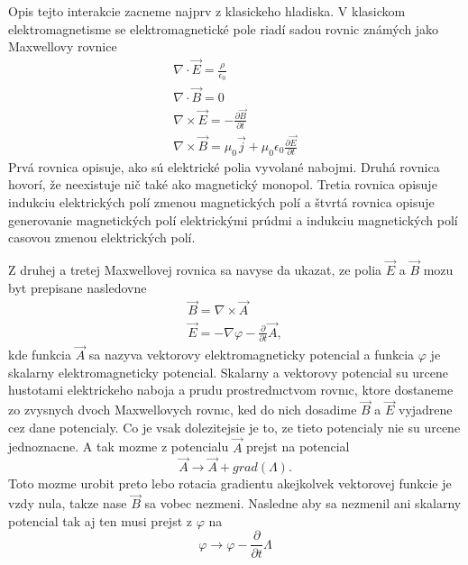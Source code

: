\documentclass[../../main.tex]{subfiles}
\begin{document}
Opis tejto interakcie zacneme najprv z klasickeho hladiska. V klasickom elektromagnetisme se elektromagnetické pole riadí sadou rovnic známých jako Maxwellovy rovnice
\begin{equation}
\begin{gathered}
\nabla \cdot \vec{E} = \frac{\rho}{\epsilon_0}\\
\nabla \cdot \vec{B} = 0\\
\nabla \times \vec{E}=-\frac{\partial \vec{B}}{\partial t}\\
\nabla \times \vec{B}= \mu_0 \vec{j}+\mu_0\epsilon_0\frac{\partial \vec{E}}{\partial t}
\end{gathered}
\end{equation} 
Prvá rovnica opisuje, ako sú elektrické polia vyvolané nabojmi. Druhá rovnica hovorí, že neexistuje nič také ako magnetický monopol. Tretia rovnica opisuje indukciu elektrických polí zmenou magnetických polí a štvrtá rovnica opisuje generovanie magnetických polí elektrickými prúdmi a indukciu magnetických polí casovou zmenou elektrických polí.\par
Z druhej a tretej Maxwellovej rovnica sa navyse da ukazat, ze polia $\vec{E}$ a $\vec{B}$ mozu byt prepisane nasledovne 
\begin{equation}
\begin{gathered}
\vec{B} = \nabla \times \vec{A}\\
\vec{E} = -\nabla\varphi-\frac{\partial}{\partial t}\vec{A},
\end{gathered}
\end{equation}  
kde funkcia $\vec{A}$ sa nazyva vektorovy elektromagneticky potencial a funkcia $\varphi$ je skalarny elektromagneticky potencial. Skalarny a vektorovy potencial su urcene hustotami elektrickeho naboja a prudu prostrednıctvom rovnıc, ktore dostaneme zo zvysnych dvoch Maxwellovych rovnıc, ked do nich dosadime $\vec{B}$ a $\vec{E}$ vyjadrene cez dane potencialy. Co je vsak dolezitejsie je to, ze tieto potencialy nie su urcene jednoznacne. A tak mozme z potencialu $\vec{A}$ prejst na potencial 
\begin{equation}
\vec{A} \rightarrow \vec{A}+grad(\Lambda).
\end{equation}
Toto mozme urobit preto lebo rotacia gradientu akejkolvek vektorovej funkcie je vzdy nula, takze nase $\vec{B}$ sa vobec nezmeni. Nasledne aby sa nezmenil ani skalarny potencial tak aj ten musi prejst z $\varphi$ na
\begin{equation}
\varphi \rightarrow \varphi -\frac{\partial}{\partial t}\Lambda
\end{equation}
\end{document}
